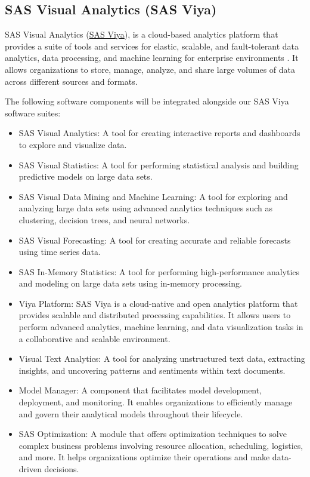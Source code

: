 \subsection{SAS Visual Analytics (SAS Viya)}
SAS Visual Analytics (\href{https://documentation.sas.com/doc/en/pgmsascdc/9.4_3.5/pgmsasgswlcm/home.htm}{SAS Viya}), is a cloud-based analytics platform that provides a suite of tools and services for elastic, scalable, and fault-tolerant data analytics, data processing, and machine learning for enterprise environments \cite{SAS2}. It allows organizations to store, manage, analyze, and share large volumes of data across different sources and formats.

The following software components will be integrated alongside our SAS Viya software suites:

\begin{itemize}
    \item SAS Visual Analytics: A tool for creating interactive reports and dashboards to explore and visualize data.
    \item SAS Visual Statistics: A tool for performing statistical analysis and building predictive models on large data sets.
    \item SAS Visual Data Mining and Machine Learning: A tool for exploring and analyzing large data sets using advanced analytics techniques such as clustering, decision trees, and neural networks.
    \item SAS Visual Forecasting: A tool for creating accurate and reliable forecasts using time series data.
    \item SAS In-Memory Statistics: A tool for performing high-performance analytics and modeling on large data sets using in-memory processing.
    \item Viya Platform: SAS Viya is a cloud-native and open analytics platform that provides scalable and distributed processing capabilities. It allows users to perform advanced analytics, machine learning, and data visualization tasks in a collaborative and scalable environment.
    \item Visual Text Analytics: A tool for analyzing unstructured text data, extracting insights, and uncovering patterns and sentiments within text documents.
    \item Model Manager: A component that facilitates model development, deployment, and monitoring. It enables organizations to efficiently manage and govern their analytical models throughout their lifecycle.
    \item SAS Optimization: A module that offers optimization techniques to solve complex business problems involving resource allocation, scheduling, logistics, and more. It helps organizations optimize their operations and make data-driven decisions.

\end{itemize}
